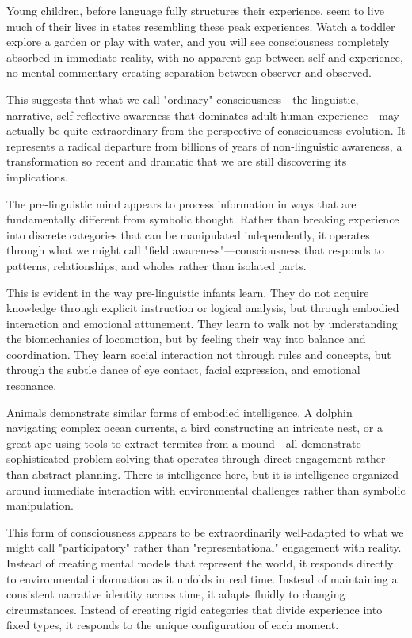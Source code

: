 Young children, before language fully structures their experience, seem to live much of their lives in states resembling these peak experiences. Watch a toddler explore a garden or play with water, and you will see consciousness completely absorbed in immediate reality, with no apparent gap between self and experience, no mental commentary creating separation between observer and observed.

This suggests that what we call "ordinary" consciousness—the linguistic, narrative, self-reflective awareness that dominates adult human experience—may actually be quite extraordinary from the perspective of consciousness evolution. It represents a radical departure from billions of years of non-linguistic awareness, a transformation so recent and dramatic that we are still discovering its implications.

The pre-linguistic mind appears to process information in ways that are fundamentally different from symbolic thought. Rather than breaking experience into discrete categories that can be manipulated independently, it operates through what we might call "field awareness"—consciousness that responds to patterns, relationships, and wholes rather than isolated parts.

This is evident in the way pre-linguistic infants learn. They do not acquire knowledge through explicit instruction or logical analysis, but through embodied interaction and emotional attunement. They learn to walk not by understanding the biomechanics of locomotion, but by feeling their way into balance and coordination. They learn social interaction not through rules and concepts, but through the subtle dance of eye contact, facial expression, and emotional resonance.

Animals demonstrate similar forms of embodied intelligence. A dolphin navigating complex ocean currents, a bird constructing an intricate nest, or a great ape using tools to extract termites from a mound—all demonstrate sophisticated problem-solving that operates through direct engagement rather than abstract planning. There is intelligence here, but it is intelligence organized around immediate interaction with environmental challenges rather than symbolic manipulation.

This form of consciousness appears to be extraordinarily well-adapted to what we might call "participatory" rather than "representational" engagement with reality. Instead of creating mental models that represent the world, it responds directly to environmental information as it unfolds in real time. Instead of maintaining a consistent narrative identity across time, it adapts fluidly to changing circumstances. Instead of creating rigid categories that divide experience into fixed types, it responds to the unique configuration of each moment.

